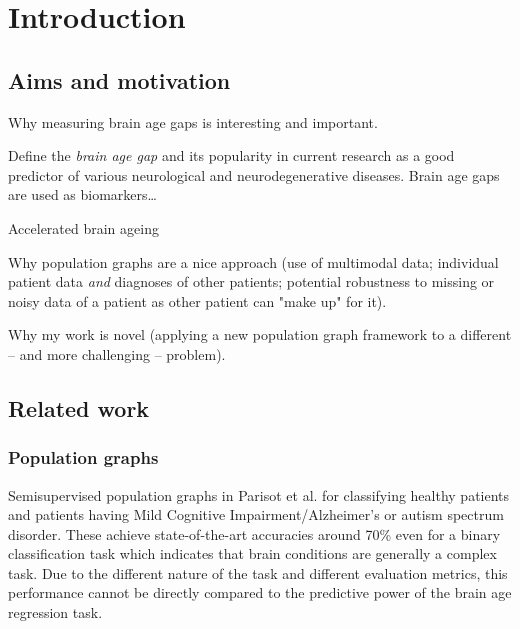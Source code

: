 \chapter{Introduction}


\section{Aims and motivation}
Why measuring brain age gaps is interesting and important.

Define the \textit{brain age gap} and its popularity in current research as a good predictor of various neurological and neurodegenerative diseases. Brain age gaps are used as biomarkers\dots

Accelerated brain ageing



Why population graphs are a nice approach (use of multimodal data; individual patient data \textit{and} diagnoses of other patients; potential robustness to missing or noisy data of a patient as other patient can "make up" for it).

Why my work is novel (applying a new population graph framework to a different – and more challenging – problem).

\section{Related work}
\subsection{Population graphs}
Semisupervised population graphs in Parisot et al. for classifying healthy patients and patients having Mild Cognitive Impairment/Alzheimer's or autism spectrum disorder. These achieve state-of-the-art accuracies around 70\% even for a binary classification task which indicates that brain conditions are generally a complex task. Due to the different nature of the task and different evaluation metrics, this performance cannot be directly compared to the predictive power of the brain age regression task.

